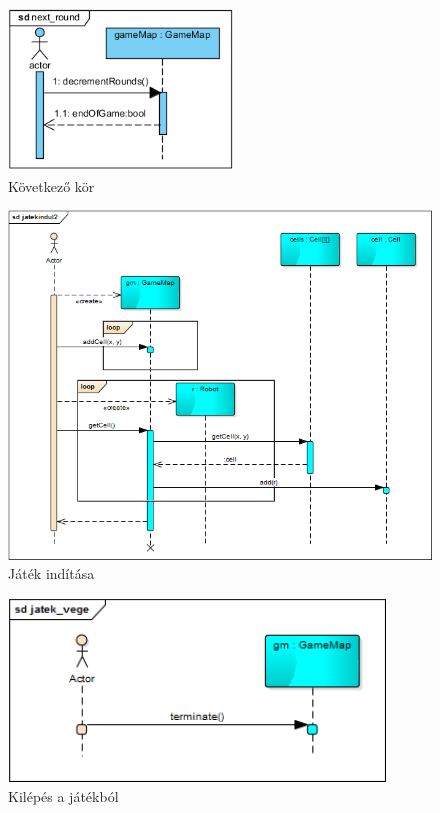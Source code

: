 \begin{figure}[!htbp]
	\begin{center}
		\includegraphics[width=6cm]{./chapters/chapter05/nextround.png}
		\caption{Következő kör}
	\end{center}
\end{figure}


\begin{figure}[!htbp]
	\begin{center}
		\includegraphics[width=14cm]{./chapters/chapter05/gamestart.png}
		\caption{Játék indítása}
	\end{center}
\end{figure}

\begin{figure}[!htbp]
	\begin{center}
		\includegraphics[width=10cm]{./chapters/chapter05/game_end.png}
		\caption{Kilépés a játékból}
	\end{center}
\end{figure}

